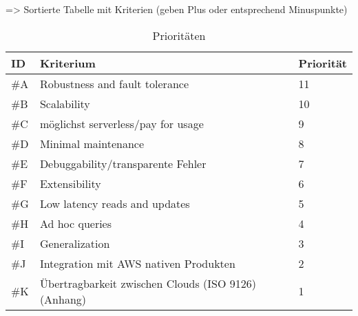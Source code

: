 





=> Sortierte Tabelle mit Kriterien (geben Plus oder entsprechend Minuspunkte)
\begin{table}[H]
\centering
\begin{tabular}{|l|l|l|}
\hline
ID & Kriterium & Priorität \\ \hline
\#A & Robustness and fault tolerance & 11 \\ \hline
\#B & Scalability & 10 \\ \hline
\#C & möglichst serverless/pay for usage & 9 \\ \hline
\#D & Minimal maintenance & 8 \\ \hline
\#E & Debuggability/transparente Fehler & 7 \\ \hline
\#F & Extensibility & 6 \\ \hline
\#G & Low latency reads and updates & 5 \\ \hline
\#H & Ad hoc queries & 4 \\ \hline
\#I & Generalization & 3 \\ \hline
\#J & Integration mit AWS nativen Produkten & 2 \\ \hline
\#K & Übertragbarkeit zwischen Clouds (ISO 9126) (Anhang) & 1 \\ \hline
\end{tabular}
\caption{Prioritäten}
\label{tab:prioritaeten}
\end{table}

